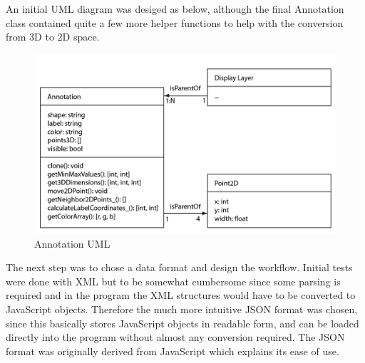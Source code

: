 \documentclass[a4paper,11pt,titlepage]{article}
\begin{document}
An initial UML diagram was desiged as below, although the final Annotation class contained quite a few more helper functions to help with the conversion from 3D to 2D space.

\begin{figure}[ht!]
\centering
\includegraphics[width=140mm]{graphics/annoUML_01.png}
\caption{Annotation UML}
\label{fig:UIdesign1}
\end{figure}





The next step was to chose a data format and design the workflow. Initial tests were done with XML but to be somewhat cumbersome since some parsing is required and in the program the XML structures would have to be converted to JavaScript objects. Therefore the much more intuitive JSON format was chosen, since this basically stores JavaScript objects in readable form, and can be loaded directly into the program without almost any conversion required. The JSON format was originally derived from JavaScript which explains its ease of use.
\end{document}
